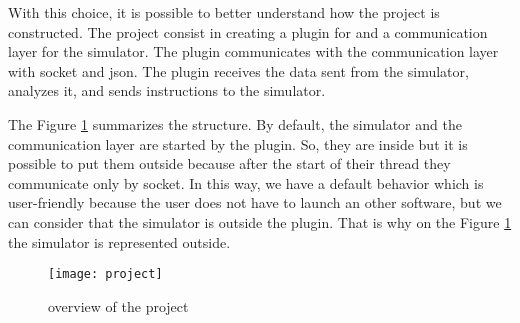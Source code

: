 With this choice, it is possible to better understand how the project is constructed. The project consist in creating a plugin for \umld and a communication layer for the simulator. The plugin communicates with the communication layer with socket and json. The plugin receives the data sent from the simulator, analyzes it, and sends instructions to the simulator.

The Figure \ref{fig:project} summarizes the structure. By default, the simulator and the communication layer are started by the plugin. So, they are inside \umld but it is possible to put them outside because after the start of their thread they communicate only by socket. In this way, we have a default behavior which is user-friendly because the user does not have to launch an other software, but we can consider that the simulator is outside the plugin. That is why on the Figure \ref{fig:project} the simulator is represented outside.

\begin{figure}[h]
  \centering
  \texttt{[image: project]}
  \caption{overview of the project}
  \label{fig:project}
\end{figure}



